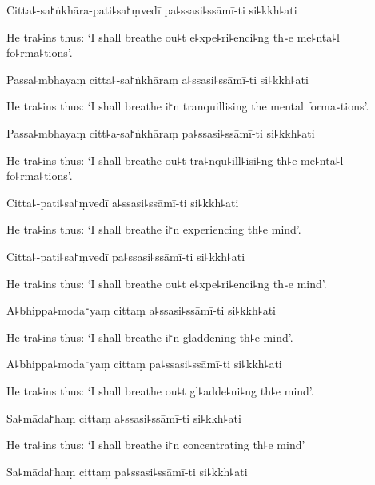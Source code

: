 Citta꜕-sa꜓ṅkhāra-pati꜕sa꜓ṃvedī pa꜕ssasi꜕ssāmī-ti si꜕kkh꜕ati

\begin{english}
  He tra꜕ins thus: `I shall breathe ou꜕t e꜕xpe꜕ri꜕enci꜕ng th꜕e me꜕nta꜕l fo꜕rma꜕tions'.
\end{english}

Passa꜕mbhayaṃ citta꜕-sa꜓ṅkhāraṃ a꜕ssasi꜕ssāmī-ti si꜕kkh꜕ati

\begin{english}
  He tra꜕ins thus: `I shall breathe i꜓n tranquillising the mental forma꜕tions'.
\end{english}

Passa꜕mbhayaṃ citt꜕a-sa꜓ṅkhāraṃ pa꜕ssasi꜕ssāmī-ti si꜕kkh꜕ati

\begin{english}
  He tra꜕ins thus: `I shall breathe ou꜕t tra꜕nqu꜕ill꜕isi꜕ng th꜕e me꜕nta꜕l fo꜕rma꜕tions'.
\end{english}

Citta꜕-pati꜕sa꜓ṃvedī a꜕ssasi꜕ssāmī-ti si꜕kkh꜕ati

\begin{english}
  He tra꜕ins thus: `I shall breathe i꜓n experiencing th꜕e mind'.
\end{english}

Citta꜕-pati꜕sa꜓ṃvedī pa꜕ssasi꜕ssāmī-ti si꜕kkh꜕ati

\begin{english}
  He tra꜕ins thus: `I shall breathe ou꜕t e꜕xpe꜕ri꜕enci꜕ng th꜕e mind'.
\end{english}

A꜕bhippa꜕moda꜓yaṃ cittaṃ a꜕ssasi꜕ssāmī-ti si꜕kkh꜕ati

\begin{english}
  He tra꜕ins thus: `I shall breathe i꜓n gladdening th꜕e mind'.
\end{english}

A꜕bhippa꜕moda꜓yaṃ cittaṃ pa꜕ssasi꜕ssāmī-ti si꜕kkh꜕ati

\begin{english}
  He tra꜕ins thus: `I shall breathe ou꜕t gl꜕adde꜕ni꜕ng th꜕e mind'.
\end{english}

Sa꜕māda꜓haṃ cittaṃ a꜕ssasi꜕ssāmī-ti si꜕kkh꜕ati

\begin{english}
  He tra꜕ins thus: `I shall breathe i꜓n concentrating th꜕e mind'
\end{english}

Sa꜕māda꜓haṃ cittaṃ pa꜕ssasi꜕ssāmī-ti si꜕kkh꜕ati

